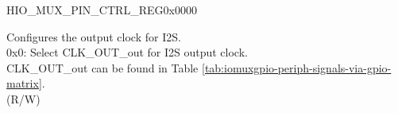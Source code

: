 \begin{register}{H}{IO\_MUX\_PIN\_CTRL\_REG}{0x0000}\label{regdesc:IOMUXPINCTRLREG}
%
%
%
%
\regnewline%
\begin{regdesc}\begin{reglist}
\label{fielddesc:IOMUXCLKOUT1}\item [IO\_MUX\_CLK\_OUT\regindex{x}] Configures the output clock for I2S.\\
0x0: Select CLK\_OUT\_out for I2S output clock.\\
CLK\_OUT\_out can be found in Table \ref{tab:iomuxgpio-periph-signals-via-gpio-matrix}. \\(R/W)
\end{reglist}\end{regdesc}
\end{register}


